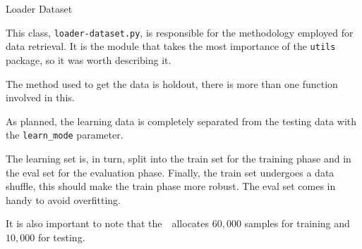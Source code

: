 \begin{subsection}{Loader Dataset}
    \label{subsubsec:loader-dataset}
    \par This class, \texttt{loader-dataset.py}, is responsible for the methodology employed for data retrieval. It is the module that takes the most importance of the \texttt{utils} package, so it was worth describing it.
    \par The method used to get the data is holdout, there is more than one function involved in this.
    
    \par As planned, the learning data is completely separated from the testing data with the \texttt{learn\_mode} parameter.
    \par The learning set is, in turn, split into the train set for the training phase and in the eval set for the evaluation phase. Finally, the train set undergoes a data shuffle, this should make the train phase more robust. The eval set comes in handy to avoid overfitting.\\
    \par It is also important to note that the~~allocates $60,000$ samples for training and $10,000$ for testing.
\end{subsection}
